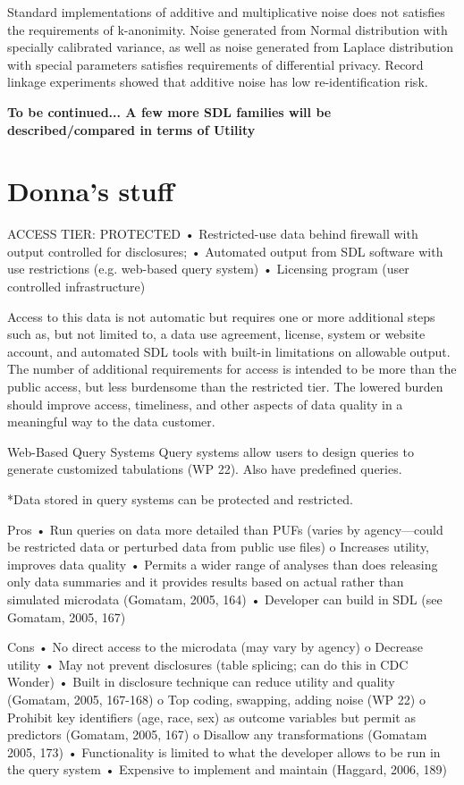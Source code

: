 \documentclass[12pt]{article}
\begin{document}
Standard implementations of additive and multiplicative noise does not satisfies the requirements of k-anonimity.
Noise generated from Normal distribution with specially calibrated variance, as well as noise generated from Laplace distribution with special parameters  satisfies requirements of  differential privacy.
Record linkage experiments showed that additive noise has low re-identification risk.



{\bf To be continued... A few more SDL families will be described/compared in terms of Utility}
 
\section{Donna's stuff}
ACCESS TIER: PROTECTED
• Restricted-use data behind firewall with output controlled for disclosures;
• Automated output from SDL software with use restrictions (e.g. web-based query system)
• Licensing program (user controlled infrastructure)

Access to this data is not automatic but requires one or more additional steps such as, but not limited to, a data use agreement, license, system or website account, and automated SDL tools with built-in limitations on allowable output. The number of additional requirements for access is intended to be more than the public access, but less burdensome than the restricted tier. The lowered burden should improve access, timeliness, and other aspects of data quality in a meaningful way to the data customer.

Web-Based Query Systems 
Query systems allow users to design queries to generate customized tabulations (WP 22). Also have predefined queries.

*Data stored in query systems can be protected and restricted.

Pros 
•	Run queries on data more detailed than PUFs (varies by agency—could be restricted data or perturbed data from public use files) 
o	Increases utility, improves data quality
•	Permits a wider range of analyses than does releasing only data summaries and it provides results based on actual rather than simulated microdata (Gomatam, 2005, 164)
•	Developer can build in SDL (see Gomatam, 2005, 167)

Cons 
•	No direct access to the microdata (may vary by agency)
o	Decrease utility
•	May not prevent disclosures (table splicing; can do this in CDC Wonder) 
•	Built in disclosure technique can reduce utility and quality (Gomatam, 2005, 167-168)
o	Top coding, swapping, adding noise (WP 22)
o	Prohibit key identifiers (age, race, sex) as outcome variables but permit as predictors (Gomatam, 2005, 167)
o	Disallow any transformations (Gomatam 2005, 173)
•	Functionality is limited to what the developer allows to be run in the query system
•	Expensive to implement and maintain (Haggard, 2006, 189)
\end{document}
